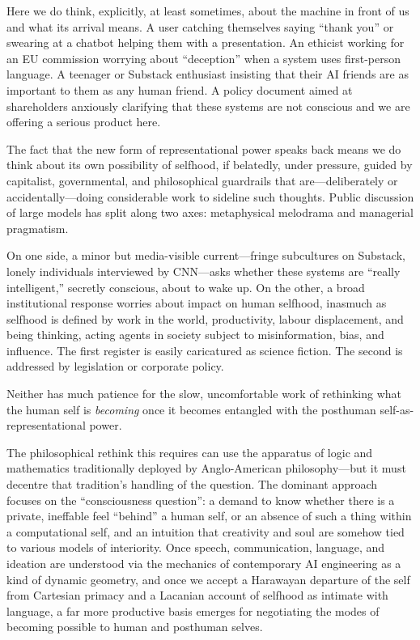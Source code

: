 Here we do think, explicitly, at least sometimes, about the machine in front of us and what its arrival means. A user catching themselves saying ``thank you'' or swearing at a chatbot helping them with a presentation. An ethicist working for an EU commission worrying about ``deception'' when a system uses first-person language. A teenager or Substack enthusiast insisting that their AI friends are as important to them as any human friend. A policy document aimed at shareholders anxiously clarifying that these systems are not conscious and we are offering a serious product here.

The fact that the new form of representational power speaks back means we do think about its own possibility of selfhood, if belatedly, under pressure, guided by capitalist, governmental, and philosophical guardrails that are---deliberately or accidentally---doing considerable work to sideline such thoughts. Public discussion of large models has split along two axes: metaphysical melodrama and managerial pragmatism.

On one side, a minor but media-visible current---fringe subcultures on Substack, lonely individuals interviewed by CNN---asks whether these systems are ``really intelligent,'' secretly conscious, about to wake up. On the other, a broad institutional response worries about impact on human selfhood, inasmuch as selfhood is defined by work in the world, productivity, labour displacement, and being thinking, acting agents in society subject to misinformation, bias, and influence. The first register is easily caricatured as science fiction. The second is addressed by legislation or corporate policy.

Neither has much patience for the slow, uncomfortable work of rethinking what the human self is \textit{becoming} once it becomes entangled with the posthuman self-as-representational power.

The philosophical rethink this requires can use the apparatus of logic and mathematics traditionally deployed by Anglo-American philosophy---but it must decentre that tradition's handling of the question. The dominant approach focuses on the ``consciousness question'': a demand to know whether there is a private, ineffable feel ``behind'' a human self, or an absence of such a thing within a computational self, and an intuition that creativity and soul are somehow tied to various models of interiority. Once speech, communication, language, and ideation are understood via the mechanics of contemporary AI engineering as a kind of dynamic geometry, and once we accept a Harawayan departure of the self from Cartesian primacy and a Lacanian account of selfhood as intimate with language, a far more productive basis emerges for negotiating the modes of becoming possible to human and posthuman selves.


